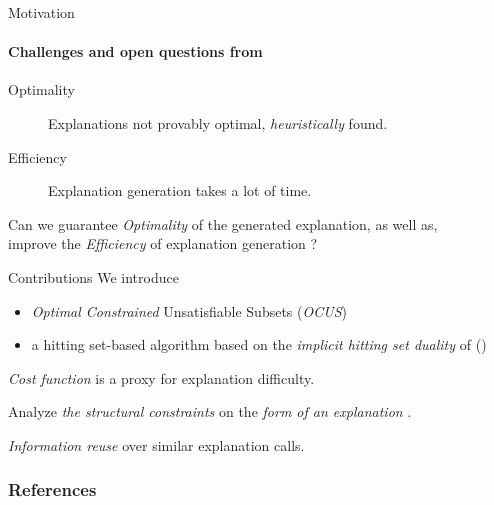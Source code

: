 \documentclass[handout]{beamer}
\begin{document}
\begin{frame}{Motivation}
	\framesubtitle{Challenges and open questions from \cite{bogaerts2020step}}
	
	\begin{description}
		\item[Optimality] Explanations not provably optimal, \emph{heuristically} found.\pause
		\item[Efficiency] Explanation generation takes a lot of time.
	\end{description}\pause
\vspace{1cm}
\begin{center}
	Can we guarantee \emph{Optimality} of the generated explanation, as well as,\\ improve the \emph{Efficiency} of explanation generation ?
\end{center}
	
\end{frame}
	
\begin{frame}{Contributions}
	We introduce 
	\begin{itemize}
		\item 	\emph{\color{vuborange}Optimal Constrained} Unsatisfiable Subsets  (\emph{\color{vuborange}OCUS})
		\item a hitting set-based algorithm based on the \emph{\color{vuborange} implicit hitting set duality} of (\cite{DBLP:journals/jar/LiffitonS08,ai/Reiter87})
	\end{itemize}\pause
	\begin{description}[font=\color{vuborange}\itshape]
		\item[Optimality] \emph{\color{vuborange} Cost function} is a proxy for explanation difficulty.\pause
	\item[Constrainedness]  Analyze \emph{\color{purple}the structural constraints} on the  \emph{\color{vuborange}form of an explanation} .\pause
	\item[Incrementality]  \emph{\color{vuborange} Information reuse} over similar explanation calls. 
	\end{description}
\end{frame}
	
	\begin{frame}[allowframebreaks]
		\frametitle{References}
		
		
	\end{frame}
\end{document}
